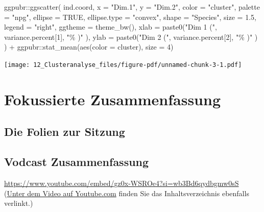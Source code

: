 \documentclass[
  10pt,
  letterpaper,
  a4paper, twoside]{scrreprt}
\newenvironment{Shaded}{\begin{snugshade}}{\end{snugshade}}
\newcommand{\AttributeTok}[1]{\textcolor[rgb]{0.40,0.45,0.13}{#1}}
\newcommand{\ConstantTok}[1]{\textcolor[rgb]{0.56,0.35,0.01}{#1}}
\newcommand{\DecValTok}[1]{\textcolor[rgb]{0.68,0.00,0.00}{#1}}
\newcommand{\FloatTok}[1]{\textcolor[rgb]{0.68,0.00,0.00}{#1}}
\newcommand{\FunctionTok}[1]{\textcolor[rgb]{0.28,0.35,0.67}{#1}}
\newcommand{\NormalTok}[1]{\textcolor[rgb]{0.00,0.23,0.31}{#1}}
\newcommand{\SpecialCharTok}[1]{\textcolor[rgb]{0.37,0.37,0.37}{#1}}
\newcommand{\StringTok}[1]{\textcolor[rgb]{0.13,0.47,0.30}{#1}}
\begin{document}
\begin{Shaded}
\begin{Highlighting}[]
\NormalTok{ggpubr}\SpecialCharTok{::}\FunctionTok{ggscatter}\NormalTok{(}
\NormalTok{  ind.coord, }\AttributeTok{x =} \StringTok{"Dim.1"}\NormalTok{, }\AttributeTok{y =} \StringTok{"Dim.2"}\NormalTok{, }
  \AttributeTok{color =} \StringTok{"cluster"}\NormalTok{, }\AttributeTok{palette =} \StringTok{"npg"}\NormalTok{, }\AttributeTok{ellipse =} \ConstantTok{TRUE}\NormalTok{, }\AttributeTok{ellipse.type =} \StringTok{"convex"}\NormalTok{,}
  \AttributeTok{shape =} \StringTok{"Species"}\NormalTok{, }\AttributeTok{size =} \FloatTok{1.5}\NormalTok{,  }\AttributeTok{legend =} \StringTok{"right"}\NormalTok{, }\AttributeTok{ggtheme =} \FunctionTok{theme\_bw}\NormalTok{(),}
  \AttributeTok{xlab =} \FunctionTok{paste0}\NormalTok{(}\StringTok{"Dim 1 ("}\NormalTok{, variance.percent[}\DecValTok{1}\NormalTok{], }\StringTok{"\% )"}\NormalTok{ ),}
  \AttributeTok{ylab =} \FunctionTok{paste0}\NormalTok{(}\StringTok{"Dim 2 ("}\NormalTok{, variance.percent[}\DecValTok{2}\NormalTok{], }\StringTok{"\% )"}\NormalTok{ )}
\NormalTok{) }\SpecialCharTok{+}
\NormalTok{  ggpubr}\SpecialCharTok{::}\FunctionTok{stat\_mean}\NormalTok{(}\FunctionTok{aes}\NormalTok{(}\AttributeTok{color =}\NormalTok{ cluster), }\AttributeTok{size =} \DecValTok{4}\NormalTok{)}
\end{Highlighting}
\end{Shaded}

\texttt{[image: 12\_Clusteranalyse\_files/figure-pdf/unnamed-chunk-3-1.pdf]}


\chapter{Fokussierte Zusammenfassung}\label{fokussierte-zusammenfassung}

\section*{Die Folien zur Sitzung}\label{die-folien-zur-sitzung-10}


\section*{Vodcast Zusammenfassung}\label{vodcast-zusammenfassung}


\url{https://www.youtube.com/embed/gz0x-WSROe4?si=wb3Bd6qydbgmw0sS}
(\href{https://www.youtube.com/watch?v=gz0x-WSROe4}{Unter dem Video auf
Youtube.com} finden Sie das Inhaltsverzeichnis ebenfalls verlinkt.)
\end{document}
